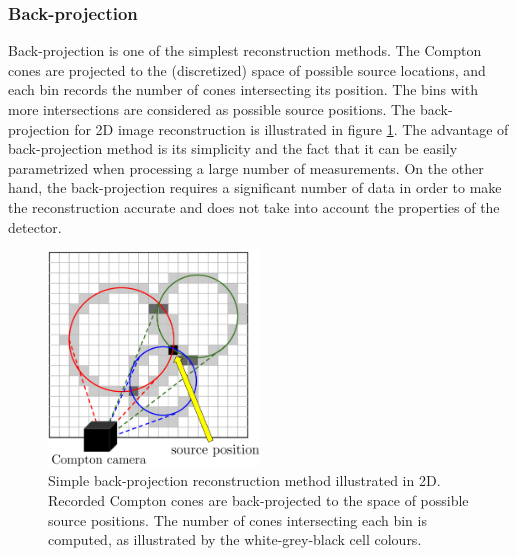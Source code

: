 \subsubsection{Back-projection}
Back-projection is one of the simplest reconstruction methods. 
The Compton cones are projected to the (discretized) space of possible source locations, and each bin records the number of cones intersecting its position. 
The bins with more intersections are considered as possible source positions.
The back-projection for 2D image reconstruction is illustrated in figure \ref{fig:bppp}.
The advantage of back-projection method is its simplicity and the fact that it can be easily parametrized when processing a large number of measurements.
On the other hand, the back-projection requires a significant number of data in order to make the reconstruction accurate and does not take into account the properties of the detector.
  \begin{figure}[!h]
    \centering
      \includegraphics[width=0.5\textwidth]{./fig/photos/back_proppp.eps}
    \caption{Simple back-projection reconstruction method illustrated in 2D. Recorded Compton cones are back-projected to the space of possible source positions. The number of cones intersecting each bin is computed, as illustrated by the white-grey-black cell colours.}
    \label{fig:bppp}
  \end{figure}

